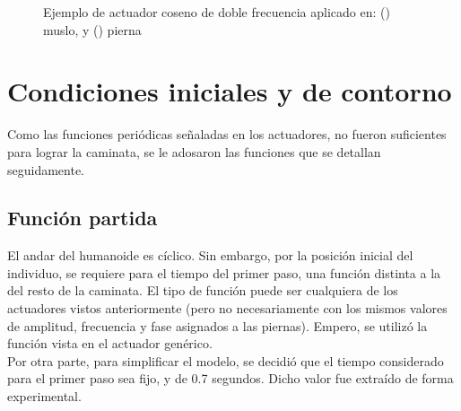 \documentclass{article}
\begin{document}
\begin{figure}[H]%
  \centering
  \captionsetup{justification=centering}
  \caption{Ejemplo de actuador coseno de doble frecuencia aplicado en: (\protect{}) muslo, y (\protect{}) pierna}%
  \label{actuadores:coseno_doble_frecuencia} %
\end{figure}


\section{Condiciones iniciales y de contorno}
Como las funciones peri\'odicas se\~naladas en los actuadores, no fueron suficientes para lograr la caminata, se le adosaron las funciones que se detallan seguidamente. 
\subsection{Funci\'on partida}
El andar del humanoide es c\'iclico. Sin embargo, por la posici\'on inicial del individuo, se requiere para el tiempo del primer paso, una funci\'on distinta a la del resto de la caminata. El tipo de funci\'on puede ser cualquiera de los actuadores vistos anteriormente (pero no necesariamente con los mismos valores de amplitud, frecuencia y fase asignados a las piernas). Empero, se utiliz\'o la funci\'on vista en el actuador gen\'erico. \\
Por otra parte, para simplificar el modelo, se decidi\'o  que el tiempo considerado para el primer paso sea fijo, y de 0.7 segundos. Dicho valor fue extra\'ido de forma experimental.
\end{document}
